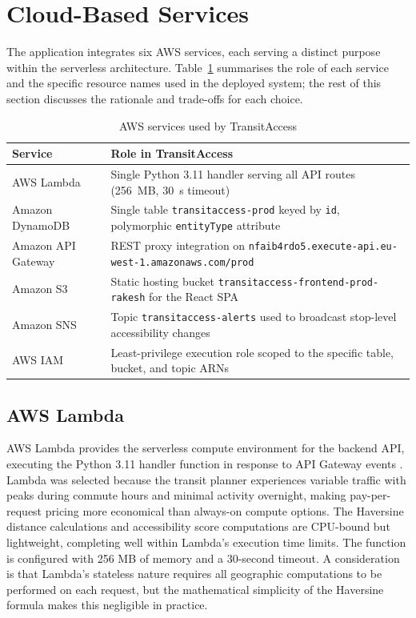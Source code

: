 \documentclass[conference]{IEEEtran}
\begin{document}
\section{Cloud-Based Services}

The application integrates six AWS services, each serving a distinct purpose within the serverless architecture. Table~\ref{tab:services} summarises the role of each service and the specific resource names used in the deployed system; the rest of this section discusses the rationale and trade-offs for each choice.

\begin{table}[H]
\centering
\caption{AWS services used by TransitAccess}
\label{tab:services}
\renewcommand{\arraystretch}{1.2}
\begin{tabularx}{\columnwidth}{|l|X|}
\hline
\textbf{Service} & \textbf{Role in TransitAccess} \\
\hline
AWS Lambda & Single Python 3.11 handler serving all API routes (256~MB, 30~s timeout) \\
\hline
Amazon DynamoDB & Single table \texttt{transitaccess-prod} keyed by \texttt{id}, polymorphic \texttt{entityType} attribute \\
\hline
Amazon API Gateway & REST proxy integration on \texttt{nfaib4rdo5.execute-api.eu-west-1.amazonaws.com/prod} \\
\hline
Amazon S3 & Static hosting bucket \texttt{transitaccess-frontend-prod-rakesh} for the React SPA \\
\hline
Amazon SNS & Topic \texttt{transitaccess-alerts} used to broadcast stop-level accessibility changes \\
\hline
AWS IAM & Least-privilege execution role scoped to the specific table, bucket, and topic ARNs \\
\hline
\end{tabularx}
\end{table}

\subsection{AWS Lambda}

AWS Lambda provides the serverless compute environment for the backend API, executing the Python 3.11 handler function in response to API Gateway events \cite{awslambda}. Lambda was selected because the transit planner experiences variable traffic with peaks during commute hours and minimal activity overnight, making pay-per-request pricing more economical than always-on compute options. The Haversine distance calculations and accessibility score computations are CPU-bound but lightweight, completing well within Lambda's execution time limits. The function is configured with 256 MB of memory and a 30-second timeout. A consideration is that Lambda's stateless nature requires all geographic computations to be performed on each request, but the mathematical simplicity of the Haversine formula makes this negligible in practice.
\end{document}
